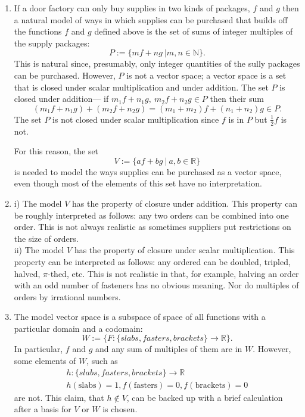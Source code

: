 \documentclass[12pt]{article}
\def\N{{\mathbb{N}}}
\begin{document}
\begin{enumerate}
\begin{enumerate}
\item 
If a door factory can only buy supplies in two kinds of packages, $f$ and $g$ then a natural model of ways in which supplies can be purchased that builds off the functions $f$ and $g$ defined above is the set of sums of integer multiples of the supply packages:
\[P:= \{ mf+ng~\vert m,n\in \N \}. \]
This is natural since, presumably, only integer quantities of the sully packages can be purchased.
However, $P$ is not a vector space; 
a vector space is a set that is closed under scalar multiplication and under addition. 
The set $P$ is  closed under addition--- if $m_1f+n_1g,~m_2f+n_2g \in P$ then their sum  
\[
(m_1f+n_1g)+(m_2f+n_2g)=  
(m_1+m_2)f+(n_1+n_2)g  
\in P.\]
The set $P$ is not closed under scalar multiplication since $f$ is in $P$ but $\frac12 f$ is not. 

For this reason, the set 
\[V:= \{ af+bg~\vert ~a,b\in \mathbb{R}\}\]
is needed to model the ways supplies can be purchased as a vector space, even though most of the elements of this set have no interpretation.

\item 
i) The model $V$ has the property of closure under addition. This property can be roughly interpreted as follows: any two orders can be combined into one order. This is not always realistic as sometimes suppliers put restrictions on the size of orders. 
\\
ii) The model $V$ has the property of closure under scalar multiplication. 
This property can be interpreted as follows: any ordered can be doubled, tripled, halved, $\pi$-thed, etc. This is not realistic in that, for example, halving an order with an odd number of  fasteners has no obvious meaning. Nor do  multiples of orders by irrational numbers. 


\item 
The model vector space is a subspace of space of all functions with a particular domain and a codomain:
\[ W:=\{  F: \{ slabs, fasters,brackets \} \to \mathbb{R}\}.\]
In particular, 
$f$ and $g$ and any sum of multiples of them are in $W$.
However, some elements of $W$, such as 
\begin{gather*}h:\{ slabs, fasters,brackets \} \to \mathbb{R}\\
 h(\text{slabs})=1,f(\text{fasters})=0, f(\text{brackets})= 0\end{gather*}
are not. This claim, that $h\notin V$, can be backed up with a brief calculation after a basis for $V$ or $W$ is chosen. 


\end{enumerate}
\end{enumerate}
\end{document}
